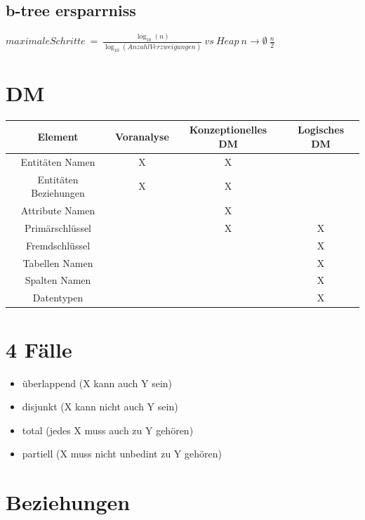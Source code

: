 \documentclass[a4paper,8pt]{article} %
\begin{document}
\begin{small}
\begin{minipage}{0.68 \linewidth}
		\subsection{b-tree ersparrniss}
		$maximale Schritte\ =\ \frac{
			\log_{10} (n)
		}{
			\log_{10} (Anzahl Verzweigungen)
		}\ vs\ Heap\ n \rightarrow \emptyset\ \frac{n}{2}$
		\section{DM}
			\begin{tabular}{c|c|c|c}
				Element					&Voranalyse	&Konzeptionelles DM	&Logisches DM\\\hline\hline
				Entitäten Namen			&X			&X					&\\\hline
				Entitäten Beziehungen	&X			&X					&\\\hline
				Attribute Namen			&			&X					&\\\hline
				Primärschlüssel			&			&X					&X\\\hline
				Fremdschlüssel			&			&					&X\\\hline
				Tabellen Namen			&			&					&X\\\hline
				Spalten Namen			&			&					&X\\\hline
				Datentypen				&			&					&X\\\hline
			\end{tabular}
			\section{4 Fälle}
			\begin{itemize}
				\item überlappend (X kann auch Y sein)
				\item disjunkt (X kann nicht auch Y sein)
				\item total (jedes X muss auch zu Y gehören)
				\item partiell (X muss nicht unbedint zu Y gehören)
			\end{itemize}
	\section{Beziehungen}

\end{minipage}
\end{small}
\end{document}
